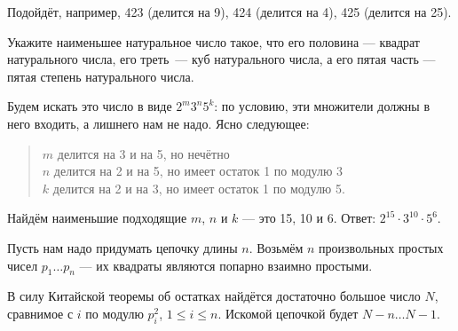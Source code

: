 \begin{itemize}

\itA Подойдёт, например, 423 (делится на 9), 424 (делится на 4), 425 (делится на 25).

\itB Укажите наименьшее натуральное число такое, что его половина — квадрат натурального числа, его треть~— куб натурального числа, а его пятая часть — пятая степень натурального числа.

Будем искать это число в виде $2^m3^n5^k$: по условию, эти множители должны в него входить, а лишнего нам не надо. Ясно следующее:

\begin{quote}
$m$ делится на 3 и на 5, но нечётно\scolon \\
$n$ делится на 2 и на 5, но имеет остаток 1 по модулю 3\scolon\\
$k$ делится на 2 и на 3, но имеет остаток 1 по модулю 5.
\end{quote}

Найдём наименьшие подходящие $m$, $n$ и $k$ — это 15, 10 и 6. Ответ: $2^{15} \cdot 3^{10} \cdot 5^6$.

\itC Пусть нам надо придумать цепочку длины $n$. Возьмём $n$ произвольных простых чисел $p_1 \ldots p_n$ — их квадраты являются попарно взаимно простыми.

В силу Китайской теоремы об остатках найдётся достаточно большое число $N$, сравнимое с $i$ по модулю $p_i^2$, $1 \le i \le n$. Искомой цепочкой будет $N-n \ldots N-1$.
\end{itemize}